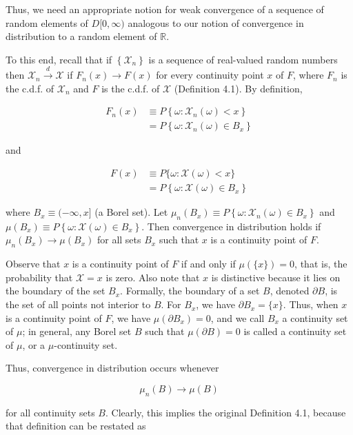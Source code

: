 \documentclass[10pt]{article}
\begin{document}
Thus, we need an appropriate notion for weak convergence of a sequence of random elements of $D[0, \infty)$ analogous to our notion of convergence in distribution to a random element of $\mathbb{R}$.

To this end, recall that if $\left\{\mathcal{X}_{n}\right\}$ is a sequence of real-valued random numbers then $\mathcal{X}_{n} \xrightarrow{d} \mathcal{X}$ if $F_{n}(x) \rightarrow F(x)$ for every continuity point $x$ of $F$, where $F_{n}$ is the c.d.f. of $\mathcal{X}_{n}$ and $F$ is the c.d.f. of $\mathcal{X}$ (Definition 4.1). By definition,

$$
\begin{aligned}
F_{n}(x) & \equiv P\left\{\omega: \mathcal{X}_{n}(\omega)<x\right\} \\
& =P\left\{\omega: \mathcal{X}_{n}(\omega) \in B_{x}\right\}
\end{aligned}
$$

and

$$
\begin{aligned}
F(x) & \equiv P\{\omega: \mathcal{X}(\omega)<x\} \\
& =P\left\{\omega: \mathcal{X}(\omega) \in B_{x}\right\}
\end{aligned}
$$

where $B_{x} \equiv(-\infty, x]$ (a Borel set). Let $\mu_{n}\left(B_{x}\right) \equiv P\left\{\omega: \mathcal{X}_{n}(\omega) \in B_{x}\right\}$ and $\mu\left(B_{x}\right) \equiv P\left\{\omega: \mathcal{X}(\omega) \in B_{x}\right\}$. Then convergence in distribution holds if $\mu_{n}\left(B_{x}\right) \rightarrow \mu\left(B_{x}\right)$ for all sets $B_{x}$ such that $x$ is a continuity point of $F$.

Observe that $x$ is a continuity point of $F$ if and only if $\mu(\{x\})=0$, that is, the probability that $\mathcal{X}=x$ is zero. Also note that $x$ is distinctive because it lies on the boundary of the set $B_{x}$. Formally, the boundary of a set $B$, denoted $\partial B$, is the set of all points not interior to $B$. For $B_{x}$, we have $\partial B_{x}=\{x\}$. Thus, when $x$ is a continuity point of $F$, we have $\mu\left(\partial B_{x}\right)=0$, and we call $B_{x}$ a continuity set of $\mu$; in general, any Borel set $B$ such that $\mu(\partial B)=0$ is called a continuity set of $\mu$, or a $\mu$-continuity set.

Thus, convergence in distribution occurs whenever

$$
\mu_{n}(B) \rightarrow \mu(B)
$$

for all continuity sets $B$. Clearly, this implies the original Definition 4.1, because that definition can be restated as
\end{document}
